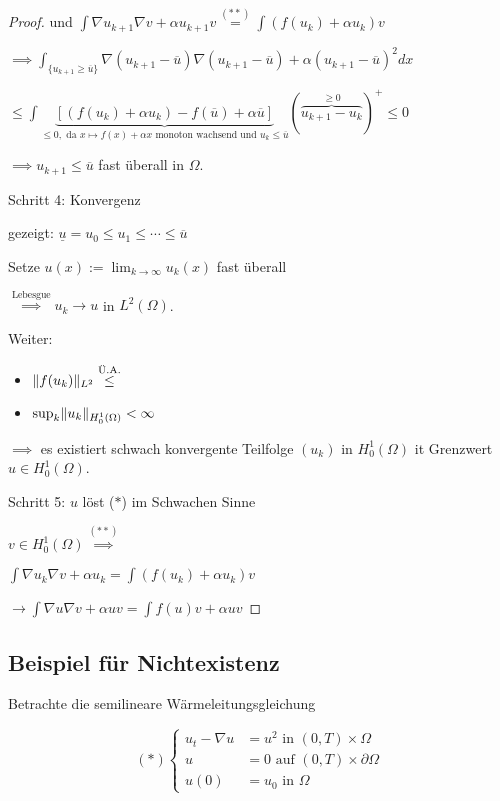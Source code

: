 \begin{proof}
  und $\int \nabla u_{k + 1} \nabla v + \alpha u_{k + 1} v \overset{(\ast \ast)}{=} \int (f(u_k) + \alpha u_k) v$

  $\implies \int_{\{u_{k + 1} \geq \overline u\}} \nabla (u_{k + 1} - \overline u) \nabla (u_{ k + 1} - \overline u) + \alpha (u_{k + 1} - \overline u)^2 dx$

  $\leq \int \underbrace{[(f(u_k) + \alpha u_k) - f(\overline u) + \alpha \overline u]}_{\leq 0, \text{ da } x \mapsto f(x) + \alpha x \text{ monoton wachsend und } u_k \leq \overline u} (\overbrace{u_{k + 1} - u_k}^{\geq 0})^+ \leq 0$

  $\implies u_{k + 1} \leq \overline u$ fast überall in $\Omega$.

  Schritt 4: Konvergenz

  gezeigt: $\underline u = u_0 \leq u_1 \leq \cdots \leq \overline u$

  Setze $u(x) := \lim_{ k \to \infty } u_k (x)$ fast überall

  $\overset{\text{Lebesgue}}{\implies} u_k \to u $ in $L^2(\Omega)$.

  Weiter: 
  \begin{itemize}
    \item $\lVert f(u_k) \rVert_{L^2} \overset{\text{Ü.A.}}{\leq}$
    \item $\sup_k \lVert u_k \rVert_{H_0^1(\Omega)} < \infty$
  \end{itemize}

  $\implies$ es existiert schwach konvergente Teilfolge $(u_k)$ in $H_0^1(\Omega)$ it Grenzwert $u \in H_0^1(\Omega)$.

  Schritt 5: $u$ löst ($\ast$) im Schwachen Sinne

  $v \in H_0^1(\Omega) \overset{(\ast\ast)}{\implies}$

  $\int \nabla u_k \nabla v + \alpha u_k = \int (f(u_k) + \alpha u_k) v$

  $\to \int \nabla u \nabla v + \alpha u v = \int f(u) v +  \alpha u v$
\end{proof}


\subsection{Beispiel für Nichtexistenz}

Betrachte die semilineare Wärmeleitungsgleichung

$$
(\ast)
\begin{cases}
  u_t - \nabla u &= u^2 \text{ in } (0, T) \times \Omega \\
  u &= 0 \text{ auf } (0,T) \times \partial \Omega \\
  u(0) &= u_0 \text{ in } \Omega  
\end{cases}
$$


